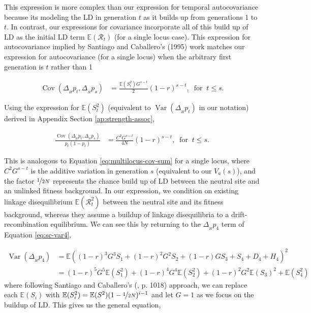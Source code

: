 \documentclass[11pt]{article}
\newcommand{\E}{\mathbb{E}}
\DeclareMathOperator{\var}{Var}
\DeclareMathOperator{\cov}{Cov}
\begin{document}
This expression is more complex than our expression for temporal autocovariance
because its modeling the LD in generation $t$ as it builds up from generations
1 to $t$. In contrast, our expressions for covariance incorporate all of this
build up of LD as the initial LD term $\E(\mathcal{R}_t)$ (for a single locus case). This
expression for autocovariance implied by Santiago and Caballero's (1995) work
matches our expression for autocovariance (for a single locus) when the
arbitrary first generation is $t$ rather than 1

\begin{align}
  \cov(\Delta_{_H} p_t, \Delta_{_H} p_s) &= \frac{\E(S_t^2)G^{s-t}}{2}  (1-r)^{s - t}, \; \; \text{for} \; \; t \le s.
\end{align}

Using the expression for $\E(S_t^2)$ (equivalent to $\var(\Delta_{_H} p_t)$ in
our notation) derived in Appendix Section \ref{ap:strength-assoc}, 

\begin{align}
  \frac{\cov(\Delta_{_H} p_t, \Delta_{_H} p_s)}{p_t(1-p_t)} &= \frac{C^2 G^{s-t}}{4N}  (1-r)^{s - t}, \; \; \text{for} \; \; t \le s.
\end{align}

This is analogous to Equation \eqref{eq:multilocus-cov-sum} for a single
locus, where $C^2 G^{s-t}$ is the additive variation in generation $s$
(equivalent to our $V_a(s)$), and the factor $\nicefrac{1}{2N}$ represents the
chance build up of LD between the neutral site and an unlinked fitness background.
In our expression, we condition on existing linkage disequilibrium $\E(\mathcal{R}_t^2)$
between the neutral site and its fitness background, whereas they assume a
buildup of linkage disequilibria to a drift-recombination equilibrium. We can
see this by returning to the $\Delta_{_H} p_4$ term of Equation
\eqref{eq:sc-var4},

\begin{align}
  \var(\Delta_{_H} p_4) &= \E\left( (1-r)^3 G^3 S_1 + (1-r)^2 G^2 S_2 + (1-r) G S_3 + S_4 + D_4 + H_4\right)^2  \\
                        &= (1-r)^5 G^5 \E(S_1^2) + (1-r)^4 G^4 \E(S_2^2) + (1-r)^2 G^2 \E(S_3)^2 + \E(S_4^2) 
\end{align}
%
where following Santiago and Caballero's (\citeyear{Santiago1995-hx}, p. 1018)
approach, we can replace each $\E(S_i)$ with $\E(S_i^2) =
\E(S^2)(1-\nicefrac{1}{2N})^{i-1}$ and let $G=1$ as we focus on the buildup of
LD. This gives us the general equation, 
\end{document}
